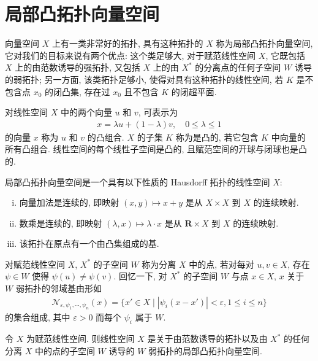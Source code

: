 \documentclass[../../main.tex]{subfiles}
\begin{document}
\section{局部凸拓扑向量空间}\label{section:ch14-局部凸}

向量空间 $X$ 上有一类非常好的拓扑, 具有这种拓扑的 $X$ 称为局部凸拓扑向量空间, 它对我们的目标来说有两个优点: 这个类足够大, 对于赋范线性空间 $X$, 它既包括 $X$ 上的由范数诱导的强拓扑, 又包括 $X$ 上的由 $X^{*}$ 的分离点的任何子空间 $W$ 诱导的弱拓扑; 另一方面, 该类拓扑足够小, 使得对具有这种拓扑的线性空间, 若 $K$ 是不包含点 $x_{0}$ 的闭凸集, 存在过 $x_{0}$ 且不包含 $K$ 的闭超平面.

对线性空间 $X$ 中的两个向量 $u$ 和 $v$, 可表示为
\begin{align*}
x=\lambda u+(1-\lambda)v,\quad 0\leqslant\lambda\leqslant 1
\end{align*}
的向量 $x$ 称为 $u$ 和 $v$ 的凸组合. $X$ 的子集 $K$ 称为是凸的, 若它包含 $K$ 中向量的所有凸组合. 线性空间的每个线性子空间是凸的, 且赋范空间的开球与闭球也是凸的.

\begin{definition}[局部凸拓扑向量空间]\label{definition:ch14-局部凸}
局部凸拓扑向量空间是一个具有以下性质的 Hausdorff 拓扑的线性空间 $X$:
\begin{enumerate}[(i)]
\item 向量加法是连续的, 即映射 $(x,y)\mapsto x+y$ 是从 $X\times X$ 到 $X$ 的连续映射.
\item 数乘是连续的, 即映射 $(\lambda,x)\mapsto\lambda\cdot x$ 是从 $\mathbf{R}\times X$ 到 $X$ 的连续映射.
\item 该拓扑在原点有一个由凸集组成的基.
\end{enumerate}
\end{definition}

对赋范线性空间 $X$, $X^{*}$ 的子空间 $W$ 称为分离 $X$ 中的点, 若对每对 $u,v\in X$, 存在 $\psi\in W$ 使得 $\psi(u)\neq\psi(v)$. 回忆一下, 对 $X^{*}$ 的子空间 $W$ 与点 $x\in X$, $x$ 关于 $W$ 弱拓扑的邻域基由形如
\begin{align*}
\mathcal{N}_{\varepsilon,\psi_{1},\cdots,\psi_{n}}(x)=\{x'\in X\mid|\psi_{i}(x-x')|<\varepsilon,1\leqslant i\leqslant n\}
\end{align*}
的集合组成, 其中 $\varepsilon>0$ 而每个 $\psi_{i}$ 属于 $W$.

\begin{proposition}\label{proposition:ch14-局部凸例}
令 $X$ 为赋范线性空间. 则线性空间 $X$ 是关于由范数诱导的拓扑以及由 $X^{*}$ 的任何分离 $X$ 中的点的子空间 $W$ 诱导的 $W$ 弱拓扑的局部凸拓扑向量空间.
\end{proposition}
\end{document}
